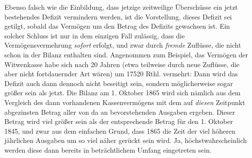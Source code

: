 Ebenso falsch wie die Einbildung, dass jetzige zeitweilige Überschüsse ein jetzt bestehendes Defizit vermindern werden, ist die Vorstellung, dieses Defizit sei getilgt, sobald das Vermögen um den Betrag des Defizits gewachsen ist. Ein solcher Schluss ist nur in dem einzigen Fall zulässig, dass die Vermögensvermehrung \textit{sofort} erfolgt, und zwar durch \textit{fremde} Zuflüsse, die nicht schon in der Bilanz enthalten sind. Angenommen zum Beispiel, das Vermögen der Witwenkasse habe sich nach 20 Jahren (etwa teilweise durch neue Zuflüsse, die aber nicht fortdauernder Art wären) um 17520 Rthl. vermehrt: Dann wird das Defizit auch dann dennoch nicht beseitigt sein, sondern möglicherweise sogar größer sein als jetzt. Die Bilanz am 1. Oktober 1865 wird sich nämlich aus dem Vergleich des dann vorhandenen Kassenvermögens mit dem auf \textit{diesen} Zeitpunkt abgezinsten Betrag aller von da an bevorstehenden Ausgaben ergeben. Dieser Betrag wird viel größer sein als der entsprechende Betrag für den 1. Oktober 1845, und zwar aus dem einfachen Grund, dass 1865 die Zeit der viel höheren jährlichen Ausgaben um so viel näher gerückt sein wird. Ja, höchstwahrscheinlich werden diese dann bereits in beträchtlichem Umfang eingetreten sein.

